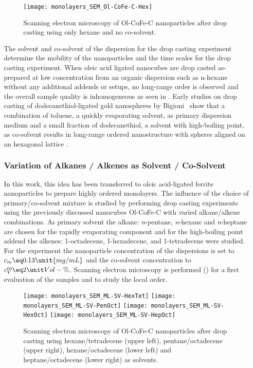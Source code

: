 \documentclass[\main/dresen_thesis.tex]{subfiles}
\begin{document}
  \label{sec:monolayers:preparation:solventProperties}
  \begin{figure}[tb]
    \centering
    \texttt{[image: monolayers\_SEM\_Ol-CoFe-C-Hex]}
    \caption{\label{fig:monolayers:preparation:solventVariation:semNoCoSolvent}Scanning electron microscopy of Ol-CoFe-C nanoparticles after drop casting using only hexane and no co-solvent.}
  \end{figure}
  The solvent and co-solvent of the dispersion for the drop casting experiment determine the mobility of the nanoparticles and the time scales for the drop casting experiment.
  When oleic acid ligated nanocubes are drop casted as-prepared at low concentration from an organic dispersion such as n-hexane without any additional addends or setups, no long-range order is observed and the overall sample quality is inhomogeneous as seen in .
  Early studies on drop casting of dodecanethiol-ligated gold nanospheres by Bigioni \etal \, show that a combination of toluene, a quickly evaporating solvent, as primary dispersion medium and a small fraction of dodecanethiol, a solvent with high-boiling point, as co-solvent results in long-range ordered nanostructure with spheres aligned on an hexagonal lattice \cite{Bigioni_2006_Kinet}.

  \subsubsection{Variation of Alkanes / Alkenes as Solvent / Co-Solvent}
    In this work, this idea has been transferred to oleic acid-ligated ferrite nanoparticles to prepare highly ordered monolayers.
    The influence of the choice of primary/co-solvent mixture is studied by performing drop casting experiments using the previously discussed nanocubes Ol-CoFe-C with varied alkane/alkene combinations.
    As primary solvent the alkane: \textit{n}-pentane, \textit{n}-hexane and \textit{n}-heptane are chosen for the rapidly evaporating component and for the high-boiling point addend the alkenes: 1-octadecene, 1-hexadecene, and 1-tetradecene were studied.
    For the experiment the nanoparticle concentration of the dispersions is set to $c_m \eq 0.13 \unit{mg/mL}$ and the co-solvent concentration to $c_V^\textsf{co} \eq 2\unit{Vol-\%}$.
    Scanning electron microscopy is performed () for a first evaluation of the samples and to study the local order.

    \begin{figure}[tb]
      \centering
      \texttt{[image: monolayers\_SEM\_ML-SV-HexTet]}
      \texttt{[image: monolayers\_SEM\_ML-SV-PenOct]}
      \texttt{[image: monolayers\_SEM\_ML-SV-HexOct]}
      \texttt{[image: monolayers\_SEM\_ML-SV-HepOct]}
      \caption{\label{fig:monolayers:preparation:solventVariation:sem}Scanning electron microscopy of Ol-CoFe-C nanoparticles after drop casting using hexane/tetradecene (upper left),  pentane/octadecene (upper right), hexane/octadecene (lower left) and heptane/octadecene (lower right) as solvents.}
    \end{figure}
\end{document}
